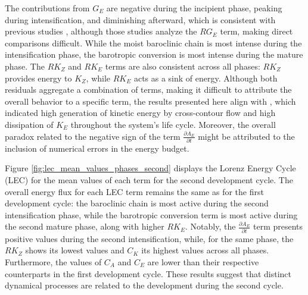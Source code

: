 The contributions from $G_E$ are negative during the incipient phase, peaking during intensification, and diminishing afterward, which is consistent with previous studies \citep[e.g.,]{michaelides1987limited,dias2011energy,wahab2002mechanism}, although those studies analyze the $RG_E$ term, making direct comparisons difficult. While the moist baroclinic chain is most intense during the intensification phase, the barotropic conversion is most intense during the mature phase. The $RK_Z$ and $RK_E$ terms are also consistent across all phases: $RK_Z$ provides energy to $K_Z$, while $RK_E$ acts as a sink of energy. Although both residuals aggregate a combination of terms, making it difficult to attribute the overall behavior to a specific term, the results presented here align with \citet{smith1980energetics}, which indicated high generation of kinetic energy by cross-contour flow and high dissipation of $K_E$ throughout the system's life cycle. Moreover, the overall paradox related to the negative sign of the term $\frac{\partial A_E}{\partial t}$ might be attributed to the inclusion of numerical errors in the energy budget.

Figure \ref{fig:lec_mean_values_phases_second} displays the Lorenz Energy Cycle (LEC) for the mean values of each term for the second development cycle. The overall energy flux for each LEC term remains the same as for the first development cycle: the baroclinic chain is most active during the second intensification phase, while the barotropic conversion term is most active during the second mature phase, along with higher $RK_E$. Notably, the $\frac{\partial A_E}{\partial t}$ term presents positive values during the second intensification, while, for the same phase, the $RK_Z$ shows its lowest values and $C_K$ its highest values across all phases. Furthermore, the values of $C_A$ and $C_E$ are lower than their respective counterparts in the first development cycle. These results suggest that distinct dynamical processes are related to the development during the second cycle.

